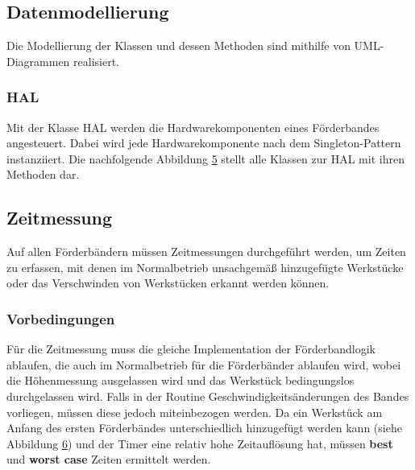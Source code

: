 \documentclass[a4paper, 11pt]{article}
\begin{document}

\subsection{Datenmodellierung}
Die Modellierung der Klassen und dessen Methoden sind mithilfe von UML-Diagrammen realisiert.
\subsubsection{HAL}
Mit der Klasse HAL werden die Hardwarekomponenten eines Förderbandes angesteuert. Dabei wird jede Hardwarekomponente nach dem Singleton-Pattern instanziiert. Die nachfolgende Abbildung \hyperref[sec:umlhal]{5} stellt alle Klassen zur HAL mit ihren Methoden dar.

\newpage

\label{sec:umlhal}
\newpage

\subsection{Zeitmessung}
Auf allen Förderbändern müssen Zeitmessungen durchgeführt werden, um Zeiten zu erfassen, mit denen im Normalbetrieb unsachgemäß hinzugefügte Werkstücke oder das Verschwinden von Werkstücken erkannt werden können.

\subsubsection{Vorbedingungen}
Für die Zeitmessung muss die gleiche Implementation der Förderbandlogik ablaufen, die auch im Normalbetrieb für die Förderbänder ablaufen wird, wobei die Höhenmessung ausgelassen wird und das Werkstück bedingungslos durchgelassen wird. Falls in der Routine Geschwindigkeitsänderungen des Bandes vorliegen, müssen diese jedoch miteinbezogen werden.
Da ein Werkstück am Anfang des ersten Förderbändes unterschiedlich hinzugefügt werden kann (siehe Abbildung \hyperref[sec:Messpunkte]{6}) und der Timer eine relativ hohe Zeitauflösung hat, müssen \textbf{best} und \textbf{worst case} Zeiten ermittelt werden. 
\end{document}
